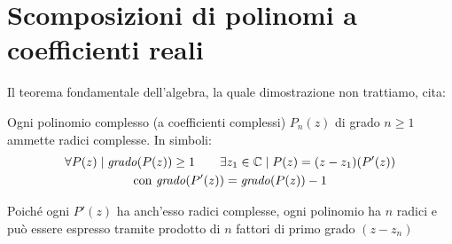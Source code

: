 %
%
%
%


\section{Scomposizioni di polinomi a coefficienti reali}
Il teorema fondamentale dell'algebra, la quale dimostrazione non trattiamo, cita:
\begin{teor}
	Ogni polinomio complesso (a coefficienti complessi) $P_n(z)$ di grado $n\geq1$ ammette radici complesse. In simboli:
	\begin{gather*}
		\forall P(z) \mid \text{\emph{grado}}(P(z))\geq1 \qquad \exists z_1\in\mathbb{C} \mid P(z)=(z-z_1)(P'(z))\\
		\text{con \emph{grado}} (P'(z))= \text{\emph{grado}} (P(z))-1
	\end{gather*}
\end{teor}
Poiché ogni $P'(z)$ ha anch'esso radici complesse, ogni polinomio ha $n$ radici e può essere espresso tramite prodotto di $n$ fattori di primo grado $(z-z_n)$


